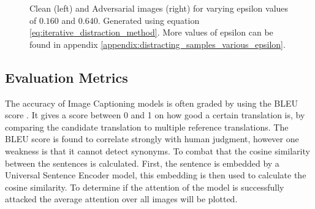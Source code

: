 \begin{figure}[h]
    \centering
    \vspace{\floatsep}
    \vspace{\floatsep}
    \vspace{\floatsep}
    \caption{Clean (left) and Adversarial images (right) for varying epsilon values of $0.160$ and $0.640$. Generated using equation \ref{eq:iterative_distraction_method}. More values of epsilon can be found in appendix \ref{appendix:distracting_samples_various_epsilon}.}
    \label{fig:distract_noise_examples}
\end{figure}

\subsection{Evaluation Metrics}
The accuracy of Image Captioning models is often graded by using the BLEU score \cite{papineni_roukos_ward_zhu_2001}. It gives a score between 0 and 1 on how good a certain translation is, by comparing the candidate translation to multiple reference translations. The BLEU score is found to correlate strongly with human judgment, however one weakness is that it cannot detect synonyms. To combat that the cosine similarity between the sentences is calculated. First, the sentence is embedded by a Universal Sentence Encoder\cite{DBLP:journals/corr/abs-1803-11175} model, this embedding is then used to calculate the cosine similarity.
To determine if the attention of the model is successfully attacked the average attention over all images will be plotted.